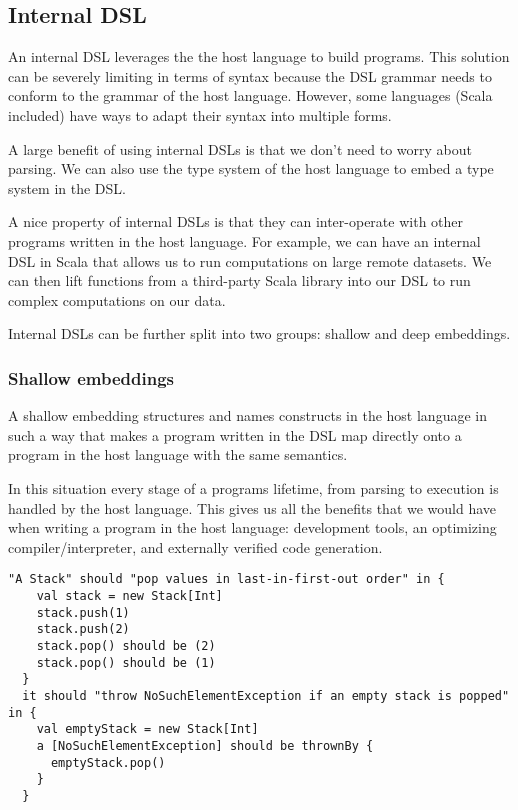 \subsection{Internal DSL}

An internal DSL leverages the the host language to build programs. This solution can be severely limiting in terms of syntax because the DSL grammar needs to conform to the grammar of the host language. However, some languages (Scala included) have ways to adapt their syntax into multiple forms.

A large benefit of using internal DSLs is that we don't need to worry about parsing. We can also use the type system of the host language to embed a type system in the DSL.

A nice property of internal DSLs is that they can inter-operate with other programs written in the host language. For example, we can have an internal DSL in Scala that allows us to run computations on large remote datasets. We can then lift functions from a third-party Scala library into our DSL to run complex computations on our data.

Internal DSLs can be further split into two groups: shallow and deep embeddings.

\subsubsection{Shallow embeddings}

A shallow embedding structures and names constructs in the host language in such a way that makes a program written in the DSL map directly onto a program in the host language with the same semantics.

In this situation every stage of a programs lifetime, from parsing to execution is handled by the host language. This gives us all the benefits that we would have when writing a program in the host language: development tools, an optimizing compiler/interpreter, and externally verified code generation.

\begin{lstlisting}[caption=Example ScalaTest code, label=code:scalatest_sample]
  "A Stack" should "pop values in last-in-first-out order" in {
    val stack = new Stack[Int]
    stack.push(1)
    stack.push(2)
    stack.pop() should be (2)
    stack.pop() should be (1)
  }
  it should "throw NoSuchElementException if an empty stack is popped" in {
    val emptyStack = new Stack[Int]
    a [NoSuchElementException] should be thrownBy {
      emptyStack.pop()
    } 
  }
\end{lstlisting}

